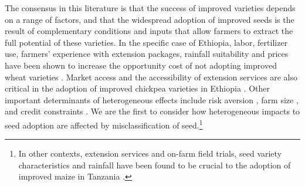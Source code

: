 \documentclass[11pt]{article}
\begin{document}



The consensus in this literature is that the success of improved varieties depends on a range of factors, and that the widespread adoption of  improved seeds is the result of complementary conditions and inputs that allow farmers to extract the full potential of these varieties. In the specific case of Ethiopia, labor, fertilizer use, farmers’ experience with extension packages, rainfall suitability and prices have been shown to increase the opportunity cost of not adopting improved wheat varieties \citep{Wale2006-bv}. Market access and the accessibility of extension services are also critical in the adoption of improved chickpea varieties in Ethiopia \citep{Verkaart2019-ol}. Other important determinants of heterogeneous effects include risk aversion \citep{Holden2016-vy}, farm size \citep{Ghimire2015-bd}, and credit constraints \citep{Simtowe2008-jn,Balana2020-hx}. We are the first to consider how heterogeneous impacts to seed adoption are affected by misclassification of seed.\footnote{In other contexts, extension services and on-farm field trials, seed variety characteristics and rainfall have been found to be crucial to the adoption of improved maize in Tanzania \citep{Kaliba2000-jh}.} 

\end{document}
